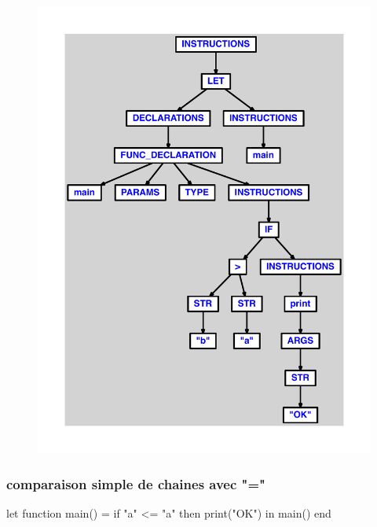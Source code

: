 \documentclass{article}
\begin{document}
\begin{figure}[H]\centering\includegraphics[max width=\textwidth]{ast/ast_176.pdf}\end{figure}\subsubsection{comparaison simple de chaines avec "="}
\begin{verbatimtab}
let
	function main() =
		if "a" <= "a" then print("OK")
in main() end
\end{verbatimtab}
\end{document}
